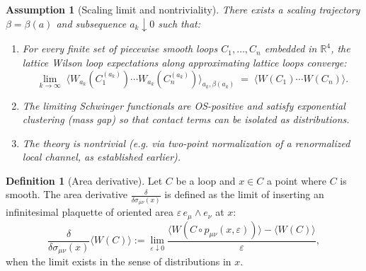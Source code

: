 \documentclass[11pt]{article}
\newtheorem{assumption}[theorem]{Assumption}
\theoremstyle{definition}
\newtheorem{definition}[theorem]{Definition}
\newcommand{\1}{\mathbf{1}}
\begin{document}
\begin{assumption}[Scaling limit and nontriviality]
\label{ass:scaling}
There exists a scaling trajectory $\beta=\beta(a)$ and subsequence $a_k\downarrow 0$ such that:
\begin{enumerate}
\item For every finite set of piecewise smooth loops $C_1,\dots,C_n$ embedded in $\mathbb R^4$, the lattice Wilson loop expectations along approximating lattice loops converge:
\begin{equation}
\lim_{k\to\infty}\;\langle W_{a_k}(C_1^{(a_k)})\cdots W_{a_k}(C_n^{(a_k)})\rangle_{a_k,\beta(a_k)}
\;=\;\langle W(C_1)\cdots W(C_n)\rangle.
\end{equation}
\item The limiting Schwinger functionals are OS-positive and satisfy exponential clustering (mass gap) so that contact terms can be isolated as distributions.
\item The theory is nontrivial (e.g. via two-point normalization of a renormalized local channel, as established earlier).
\end{enumerate}
\end{assumption}

\begin{definition}[Area derivative]
Let $C$ be a loop and $x\in C$ a point where $C$ is smooth. The area derivative $\frac{\delta}{\delta \sigma_{\mu\nu}(x)}$ is defined as the limit of inserting an infinitesimal plaquette of oriented area $\varepsilon\,e_\mu\wedge e_\nu$ at $x$:
\begin{equation}
\frac{\delta}{\delta \sigma_{\mu\nu}(x)}\langle W(C)\rangle
:=\lim_{\varepsilon\downarrow 0}\frac{\langle W(C\circ p_{\mu\nu}(x,\varepsilon))\rangle-\langle W(C)\rangle}{\varepsilon},
\end{equation}
when the limit exists in the sense of distributions in $x$.
\end{definition}
\end{document}
